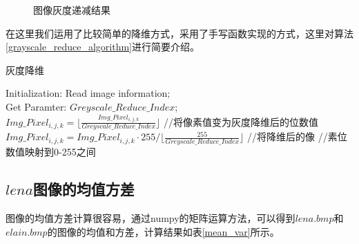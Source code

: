 \documentclass[UTF8]{ctexart}
\begin{document}
\begin{figure}[h!]
	\hspace{0.1in} 
	\hspace{0.1in} 	
	\caption{图像灰度递减结果} 
	\label{greyscale_reduce_result} %
\end{figure}

在这里我们运用了比较简单的降维方式，采用了手写函数实现的方式，这里对算法\ref{grayscale_reduce_algorithm}进行简要介绍。

\begin{algorithm}[h!]
	\caption{灰度降维}
	\label{grayscale_reduce_algorithm}
	Initialization: Read image information; \\
	Get Paramter: $Greyscale\_Reduce\_Index$; \\
	{
		{
			{
				$Img\_Pixel_{i,j,k} = \biggl\lfloor\frac{Img\_Pixel_{i,j,k}}{Greyscale\_Reduce\_Index}\biggr\rfloor $ //将像素值变为灰度降维后的位数值 \\
				$Img\_Pixel_{i,j,k} = Img\_Pixel_{i,j,k} \cdot  255 / \biggl\lfloor\frac{255}{Greyscale\_Reduce\_Index}\biggr\rfloor  $ //将降维后的像 \newline //素位数值映射到0-255之间
			}
		}
	}
\end{algorithm}

\subsection{$lena$图像的均值方差}

图像的均值方差计算很容易，通过numpy的矩阵运算方法，可以得到$lena.bmp$和$elain.bmp$的图像的均值和方差，计算结果如表\ref{mean_var}所示。
\end{document}
